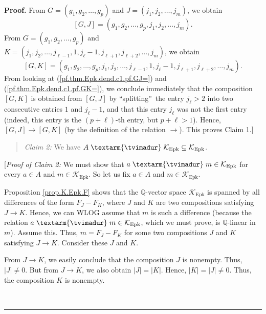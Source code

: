 \documentclass[numbers=enddot,12pt,final,onecolumn,notitlepage]{scrartcl}%
\theoremstyle{definition}
\newenvironment{statement}{\begin{quote}}{\end{quote}}
\newenvironment{proof}[1][Proof]{\noindent\textbf{#1.} }{\ \rule{0.5em}{0.5em}}
\newenvironment{verlong}{}{}
\newcommand{\tvi}{\left. \textarm{\tvimadur} \right.}
\begin{document}
\begin{verlong}
\begin{proof}
From $G=\left(  g_{1},g_{2},\ldots,g_{p}\right)  $ and $J=\left(  j_{1}%
,j_{2},\ldots,j_{m}\right)  $, we obtain%
\begin{equation}
\left[  G,J\right]  =\left(  g_{1},g_{2},\ldots,g_{p},j_{1},j_{2},\ldots
,j_{m}\right)  . \label{pf.thm.Epk.dend.c1.pf.GJ=}%
\end{equation}
From $G=\left(  g_{1},g_{2},\ldots,g_{p}\right)  $ and $K=\left(  j_{1}%
,j_{2},\ldots,j_{\ell-1},1,j_{\ell}-1,j_{\ell+1},j_{\ell+2},\ldots
,j_{m}\right)  $, we obtain%
\begin{equation}
\left[  G,K\right]  =\left(  g_{1},g_{2},\ldots,g_{p},j_{1},j_{2}%
,\ldots,j_{\ell-1},1,j_{\ell}-1,j_{\ell+1},j_{\ell+2},\ldots,j_{m}\right)  .
\label{pf.thm.Epk.dend.c1.pf.GK=}%
\end{equation}
From looking at (\ref{pf.thm.Epk.dend.c1.pf.GJ=}) and
(\ref{pf.thm.Epk.dend.c1.pf.GK=}), we conclude immediately that the
composition $\left[  G,K\right]  $ is obtained from $\left[  G,J\right]  $ by
\textquotedblleft splitting\textquotedblright\ the entry $j_{\ell}>2$ into two
consecutive entries $1$ and $j_{\ell}-1$, and that this entry $j_{\ell}$ was
not the first entry (indeed, this entry is the $\left(  p+\ell\right)  $-th
entry, but $p+\ell>1$). Hence, $\left[  G,J\right]  \rightarrow\left[
G,K\right]  $ (by the definition of the relation $\rightarrow$). This proves
Claim 1.]

\begin{statement}
\textit{Claim 2:} We have $A\tvi  \mathcal{K}_{\operatorname{Epk}}%
\subseteq\mathcal{K}_{\operatorname{Epk}}$.
\end{statement}

[\textit{Proof of Claim 2:} We must show that $a\tvi  m\in\mathcal{K}%
_{\operatorname{Epk}}$ for every $a\in A$ and $m\in\mathcal{K}%
_{\operatorname{Epk}}$. So let us fix $a\in A$ and $m\in\mathcal{K}%
_{\operatorname{Epk}}$.

Proposition \ref{prop.K.Epk.F} shows that the $\mathbb{Q}$-vector space
$\mathcal{K}_{\operatorname{Epk}}$ is spanned by all differences of the form
$F_{J}-F_{K}$, where $J$ and $K$ are two compositions satisfying $J\rightarrow
K$. Hence, we can WLOG assume that $m$ is such a difference (because the
relation $a\tvi  m\in\mathcal{K}_{\operatorname{Epk}}$, which we must prove,
is $\mathbb{Q}$-linear in $m$). Assume this. Thus, $m=F_{J}-F_{K}$ for some
two compositions $J$ and $K$ satisfying $J\rightarrow K$. Consider these $J$
and $K$.

From $J\rightarrow K$, we easily conclude that the composition $J$ is
nonempty. Thus, $\left\vert J\right\vert \neq0$. But from $J\rightarrow K$, we
also obtain $\left\vert J\right\vert =\left\vert K\right\vert $. Hence,
$\left\vert K\right\vert =\left\vert J\right\vert \neq0$. Thus, the
composition $K$ is nonempty.


\end{proof}
\end{verlong}
\end{document}
